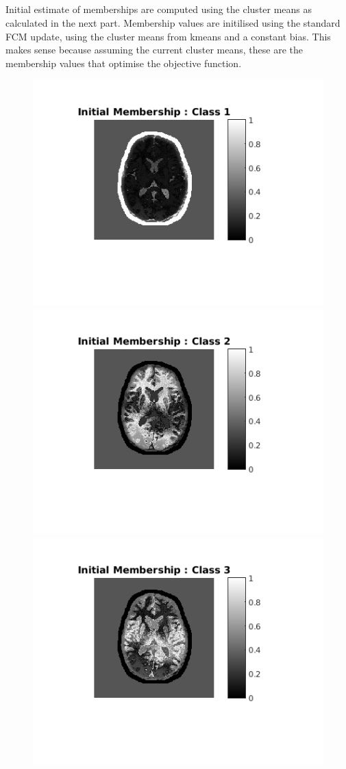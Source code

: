 \documentclass[11pt]{article}
\begin{document}
\subsection{}
Initial estimate of memberships are computed using the cluster means as calculated in the next part. Membership values are initilised using the standard FCM update, using the cluster means from kmeans and a constant bias. This makes sense because assuming the current cluster means, these are the membership values that optimise the objective function.
\begin{figure}[h]
\centering
\includegraphics[]{init1}
\includegraphics[]{init2}
\includegraphics[]{init3}
\end{figure}
\end{document}
